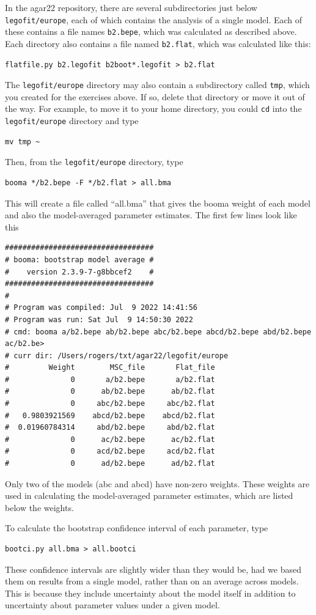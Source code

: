 \documentclass[11pt]{article}
\begin{document}
In the agar22 repository, there are several subdirectories just below
\texttt{legofit/europe}, each of which contains the analysis of a
single model. Each of these contains a file names \texttt{b2.bepe},
which was calculated as described above. Each directory also contains
a file named \texttt{b2.flat}, which was calculated like this:
\begin{verbatim}
flatfile.py b2.legofit b2boot*.legofit > b2.flat
\end{verbatim}
The \texttt{legofit/europe} directory may also contain a subdirectory
called \texttt{tmp}, which you created for the exercises above. If so,
delete that directory or move it out of the way. For example, to move
it to your home directory, you could \texttt{cd} into the
\texttt{legofit/europe} directory and type
\begin{verbatim}
mv tmp ~
\end{verbatim}
Then, from the \texttt{legofit/europe} directory, type
\begin{verbatim}
booma */b2.bepe -F */b2.flat > all.bma
\end{verbatim}
This will create a file called ``all.bma'' that gives the booma weight
of each model and also the model-averaged parameter estimates. The
first few lines look like this
\begin{verbatim}
##################################
# booma: bootstrap model average #
#    version 2.3.9-7-g8bbcef2    #
##################################
#
# Program was compiled: Jul  9 2022 14:41:56
# Program was run: Sat Jul  9 14:50:30 2022
# cmd: booma a/b2.bepe ab/b2.bepe abc/b2.bepe abcd/b2.bepe abd/b2.bepe ac/b2.be>
# curr dir: /Users/rogers/txt/agar22/legofit/europe
#         Weight        MSC_file       Flat_file
#              0       a/b2.bepe       a/b2.flat
#              0      ab/b2.bepe      ab/b2.flat
#              0     abc/b2.bepe     abc/b2.flat
#   0.9803921569    abcd/b2.bepe    abcd/b2.flat
#  0.01960784314     abd/b2.bepe     abd/b2.flat
#              0      ac/b2.bepe      ac/b2.flat
#              0     acd/b2.bepe     acd/b2.flat
#              0      ad/b2.bepe      ad/b2.flat
\end{verbatim}
Only two of the models (abc and abcd) have non-zero weights.  These
weights are used in calculating the model-averaged parameter
estimates, which are listed below the weights.

To calculate the bootstrap confidence interval of each parameter, type
\begin{verbatim}
bootci.py all.bma > all.bootci
\end{verbatim}
These confidence intervals are slightly wider than they would be, had
we based them on results from a single model, rather than on an
average across models. This is because they include uncertainty about
the model itself in addition to uncertainty about parameter values
under a given model.
\end{document}
